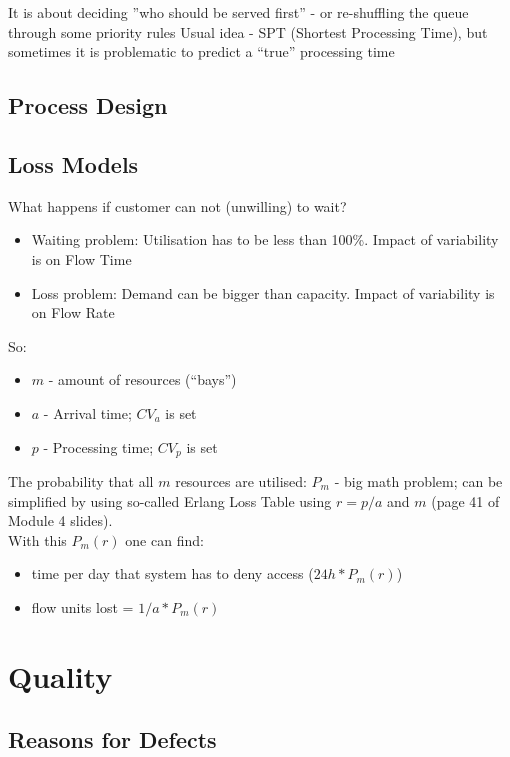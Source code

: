 \documentclass{scrartcl}
\begin{document}
It is about deciding ''who should be served first'' - or re-shuffling the queue through some priority rules
Usual idea - SPT (Shortest Processing Time), but sometimes it is problematic to predict a ``true'' processing time

\subsection{Process Design}
\label{sec:06-06}


\subsection{Loss Models}
\label{sec:06-07}

What happens if customer can not (unwilling) to wait?
\begin{itemize}
\item Waiting problem: Utilisation has to be less than 100\%. Impact of variability is on Flow Time
\item Loss problem: Demand can be bigger than capacity. Impact of variability is on Flow Rate
\end{itemize}

So:
\begin{itemize}
\item $m$ - amount of resources (``bays'')
\item $a$ - Arrival time; $CV_a$ is set
\item $p$ - Processing time; $CV_p$ is set
\end{itemize}

The probability that all $m$ resources are utilised: $P_m$ - big math problem; can be simplified by using so-called Erlang Loss Table using $r=p / a$ and $m$ (page 41 of Module 4 slides).\\
With this $P_m(r)$ one can find:
\begin{itemize}
\item time per day that system has to deny access ($24h * P_m(r)$)
\item flow units lost = $1 / a * P_m(r)$
\end{itemize}

\section{Quality}
\label{sec:07}

\subsection{Reasons for Defects}
\label{sec:07-01}
\end{document}
